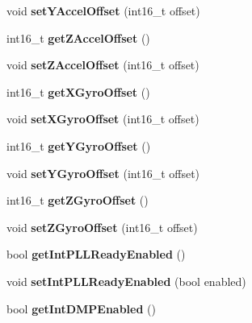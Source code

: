 \begin{DoxyCompactItemize}
void {\bfseries set\+Y\+Accel\+Offset} (int16\+\_\+t offset)
\item 
\mbox{\label{classMPU6050_ac9a45355c735a09501b6a58c92fb752c}} 
int16\+\_\+t {\bfseries get\+Z\+Accel\+Offset} ()
\item 
\mbox{\label{classMPU6050_a4d1868b660d695eae912ef73407e21e8}} 
void {\bfseries set\+Z\+Accel\+Offset} (int16\+\_\+t offset)
\item 
\mbox{\label{classMPU6050_a4c1b9f42f59b11936da86b2a1b099981}} 
int16\+\_\+t {\bfseries get\+X\+Gyro\+Offset} ()
\item 
\mbox{\label{classMPU6050_a7097c12d38a23fb0a286460619998470}} 
void {\bfseries set\+X\+Gyro\+Offset} (int16\+\_\+t offset)
\item 
\mbox{\label{classMPU6050_a1874f796bd3ad97c5a72ab559b33e4a7}} 
int16\+\_\+t {\bfseries get\+Y\+Gyro\+Offset} ()
\item 
\mbox{\label{classMPU6050_a9a725bf3be4e1a74e5f655194bf22bde}} 
void {\bfseries set\+Y\+Gyro\+Offset} (int16\+\_\+t offset)
\item 
\mbox{\label{classMPU6050_aec9b1f7b83d8850858f4200b3afa79fd}} 
int16\+\_\+t {\bfseries get\+Z\+Gyro\+Offset} ()
\item 
\mbox{\label{classMPU6050_aacf6f5599adbfb8ec685f2b96db6905e}} 
void {\bfseries set\+Z\+Gyro\+Offset} (int16\+\_\+t offset)
\item 
\mbox{\label{classMPU6050_a4d02c38682aa566b6204df3f81fbcb68}} 
bool {\bfseries get\+Int\+P\+L\+L\+Ready\+Enabled} ()
\item 
\mbox{\label{classMPU6050_aef44106927c1b986588f36bffaebea54}} 
void {\bfseries set\+Int\+P\+L\+L\+Ready\+Enabled} (bool enabled)
\item 
\mbox{\label{classMPU6050_a3af3f3c0a16b5b68cf6301cb0ac3f392}} 
bool {\bfseries get\+Int\+D\+M\+P\+Enabled} ()
\item 
\mbox{\label{classMPU6050_a889d29900cb0dd16e0199c13822f0f88}} 

\end{DoxyCompactItemize}

